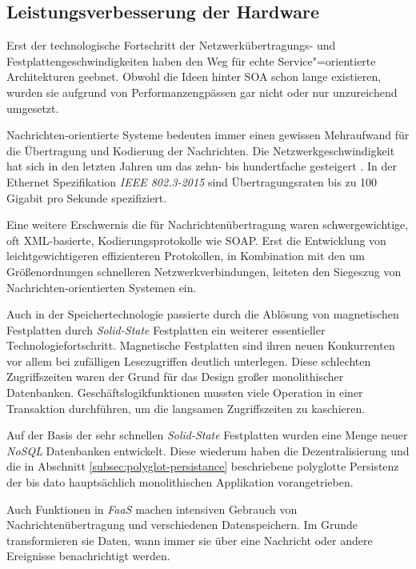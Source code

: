 \subsection{Leistungsverbesserung der Hardware}

Erst der technologische Fortschritt der Netzwerkübertragungs- und Festplattengeschwindigkeiten haben den Weg für echte Service"=orientierte Architekturen geebnet. Obwohl die Ideen hinter SOA schon lange existieren, wurden sie aufgrund von Performanzengpässen gar nicht oder nur unzureichend umgesetzt.

Nachrichten-orientierte Systeme bedeuten immer einen gewissen Mehraufwand für die Übertragung und Kodierung der Nachrichten. Die Netzwerkgeschwindigkeit hat sich in den letzten Jahren um das zehn- bis hundertfache gesteigert \cite{IEEEBandwidth}. In der Ethernet Spezifikation \textit{IEEE 802.3-2015} sind Übertragungsraten bis zu 100 Gigabit pro Sekunde spezifiziert.

Eine weitere Erschwernis die für Nachrichtenübertragung waren schwergewichtige, oft XML-basierte, Kodierungsprotokolle wie \zB SOAP. Erst die Entwicklung von leichtgewichtigeren \bzw effizienteren Protokollen, in Kombination mit den um Größenordnungen schnelleren Netzwerkverbindungen, leiteten den Siegeszug von Nachrichten-orientierten Systemen ein.

Auch in der Speichertechnologie passierte durch die Ablösung von magnetischen Festplatten durch \textit{Solid-State} Festplatten ein weiterer essentieller Technologiefortschritt. Magnetische Festplatten sind ihren neuen Konkurrenten vor allem bei zufälligen Lesezugriffen deutlich unterlegen. Diese schlechten Zugriffszeiten waren der Grund für das Design großer monolithischer Datenbanken. Geschäftslogikfunktionen mussten viele Operation in einer Transaktion durchführen, um die langsamen Zugriffszeiten zu kaschieren.

Auf der Basis der sehr schnellen \textit{Solid-State} Festplatten wurden eine Menge neuer \textit{NoSQL} Datenbanken entwickelt. Diese wiederum haben die Dezentralisierung und die in Abschnitt \ref{subsec:polyglot-persistance} beschriebene polyglotte Persistenz der bis dato hauptsächlich monolithischen Applikation vorangetrieben.

Auch Funktionen in \textit{FaaS} machen intensiven Gebrauch von Nachrichtenübertragung und verschiedenen Datenspeichern. Im Grunde transformieren sie Daten, wann immer sie über eine Nachricht oder andere Ereignisse benachrichtigt werden.

